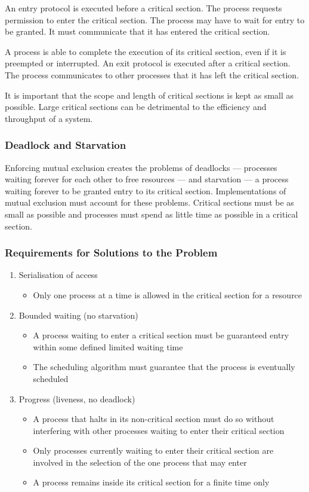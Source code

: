 An entry protocol is executed before a critical section.
The process requests permission to enter the critical section.
The process may have to wait for entry to be granted.
It must communicate that it has entered the critical section.

A process is able to complete the execution of its critical section, even if it is preempted or interrupted.
An exit protocol is executed after a critical section.
The process communicates to other processes that it has left the critical section.

It is important that the scope and length of critical sections is kept as small as possible.
Large critical sections can be detrimental to the efficiency and throughput of a system.

\subsubsection{Deadlock and Starvation}

Enforcing mutual exclusion creates the problems of deadlocks --- processes waiting forever for each other to free resources --- and starvation --- a process waiting forever to be granted entry to its critical section.
Implementations of mutual exclusion must account for these problems.
Critical sections must be as small as possible and processes must spend as little time as possible in a critical section.

\subsubsection{Requirements for Solutions to the Problem}

\begin{enumerate}
  \item Serialisation of access
  \begin{itemize}
    \item Only one process at a time is allowed in the critical section for a resource
  \end{itemize}
  \item Bounded waiting (no starvation)
  \begin{itemize}
    \item A process waiting to enter a critical section must be guaranteed entry within some defined limited waiting time
    \item The scheduling algorithm must guarantee that the process is eventually scheduled
  \end{itemize}
  \item Progress (liveness, no deadlock)
  \begin{itemize}
    \item A process that halts in its non-critical section must do so without interfering with other processes waiting to enter their critical section
    \item Only processes currently waiting to enter their critical section are involved in the selection of the one process that may enter
    \item A process remains inside its critical section for a finite time only
  \end{itemize}
\end{enumerate}

